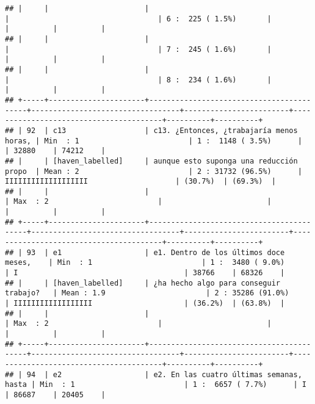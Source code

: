 \documentclass[]{article}
\begin{document}
\begin{verbatim}
## |     |                      |                                          |                                  | 6 :  225 ( 1.5%)       |                                        |          |          |
## |     |                      |                                          |                                  | 7 :  245 ( 1.6%)       |                                        |          |          |
## |     |                      |                                          |                                  | 8 :  234 ( 1.6%)       |                                        |          |          |
## +-----+----------------------+------------------------------------------+----------------------------------+------------------------+----------------------------------------+----------+----------+
## | 92  | c13                  | c13. ¿Entonces, ¿trabajaría menos horas, | Min  : 1                         | 1 :  1148 ( 3.5%)      |                                        | 32880    | 74212    |
## |     | [haven_labelled]     | aunque esto suponga una reducción propo  | Mean : 2                         | 2 : 31732 (96.5%)      | IIIIIIIIIIIIIIIIIII                    | (30.7%)  | (69.3%)  |
## |     |                      |                                          | Max  : 2                         |                        |                                        |          |          |
## +-----+----------------------+------------------------------------------+----------------------------------+------------------------+----------------------------------------+----------+----------+
## | 93  | e1                   | e1. Dentro de los últimos doce meses,    | Min  : 1                         | 1 :  3480 ( 9.0%)      | I                                      | 38766    | 68326    |
## |     | [haven_labelled]     | ¿ha hecho algo para conseguir trabajo?   | Mean : 1.9                       | 2 : 35286 (91.0%)      | IIIIIIIIIIIIIIIIII                     | (36.2%)  | (63.8%)  |
## |     |                      |                                          | Max  : 2                         |                        |                                        |          |          |
## +-----+----------------------+------------------------------------------+----------------------------------+------------------------+----------------------------------------+----------+----------+
## | 94  | e2                   | e2. En las cuatro últimas semanas, hasta | Min  : 1                         | 1 :  6657 ( 7.7%)      | I                                      | 86687    | 20405    |

\end{verbatim}
\end{document}
